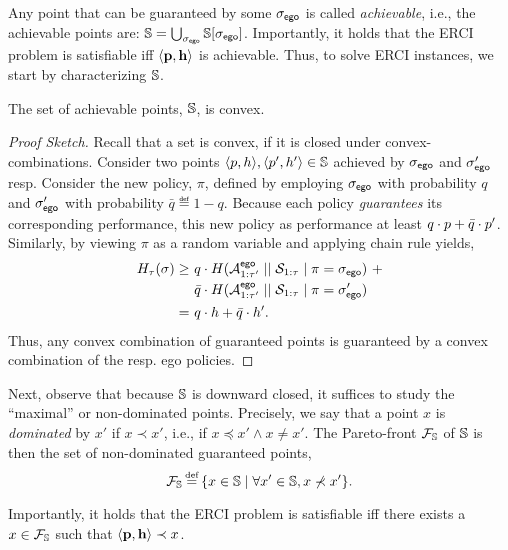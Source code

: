 Any point that can be guaranteed by some ${\sigma_{\mathsf{ego}}}$ is called
\emph{achievable}, i.e., the achievable points are: $ \mathbb{S} =
\bigcup_{{\sigma_{\mathsf{ego}}}} \mathbb{S}[{\sigma_{\mathsf{ego}}}]$.  Importantly, it holds
that the ERCI problem is satisfiable iff $\langle \mathbf{p},
\mathbf{h} \rangle$ is achievable.   Thus, to solve ERCI instances, we start by characterizing
$\mathbb{S}$.


\begin{proposition}
  The set of achievable points, $\mathbb{S}$, is convex. 
\end{proposition}
\begin{proof}[Proof Sketch]
  Recall that a set is convex, if it is closed under
  convex-combinations\footnotemark. Consider two points
  $\langle p, h \rangle, \langle p', h' \rangle \in
  \mathbb{S}$ achieved by ${\sigma_{\mathsf{ego}}}$ and ${\sigma'_{\mathsf{ego}}}$
  resp. Consider the new policy, $\pi$, defined by employing
  ${\sigma_{\mathsf{ego}}}$ with probability $q$ and ${\sigma'_{\mathsf{ego}}}$ with
  probability $\bar{q} \eqdef 1 - q$.  Because each policy
  \emph{guarantees} its corresponding performance, this new policy as
  performance at least $q\cdot p + \bar{q}\cdot p'$.  Similarly,
  by viewing $\pi$ as a random variable and applying chain rule
  yields,
  \begin{equation}
    \begin{split}
      H_\tau(\sigma)
      \geq &~q \cdot H( {\mathcal{A}}^{\mathsf{ego}}_{1:\tau'} \mid\mid {\mathcal{S}}_{1:\tau} \mid \pi={\sigma_{\mathsf{ego}}})~+\\
      &~\bar{q}  \cdot H( {\mathcal{A}}^{\mathsf{ego}}_{1:\tau'} \mid\mid {\mathcal{S}}_{1:\tau} \mid \pi={\sigma'_{\mathsf{ego}}})\\
      =&~q\cdot h + \bar{q}\cdot h'.
    \end{split}
  \end{equation}
  Thus, any convex combination of guaranteed points is guaranteed by
  a convex combination of the resp. ego policies.
\end{proof}

Next, observe that because $\mathbb{S}$ is downward closed, it
suffices to study the ``maximal'' or non-dominated points.  Precisely,
we say that a point $x$ is \emph{dominated} by $x'$ if $x \prec
x'$, i.e., if $x \preceq x' \wedge x \neq x'$.
The Pareto-front $\mathcal{F}_{\mathbb{S}}$ of $\mathbb{S}$ is then the set of non-dominated guaranteed points,
\begin{equation}
  \pareto{\solutions} \eqdef \{ x \in \solutions \mid \forall x' \in \solutions, x \not\prec x'  \}.  
\end{equation}
\noindent
\begin{mdframed}
Importantly, it holds that the ERCI problem is satisfiable iff there exists a  $x \in \mathcal{F}_{\mathbb{S}}$ such that $\langle \mathbf{p}, \mathbf{h} \rangle \prec x$.    
\end{mdframed}
\begin{example}
	
\end{example}


